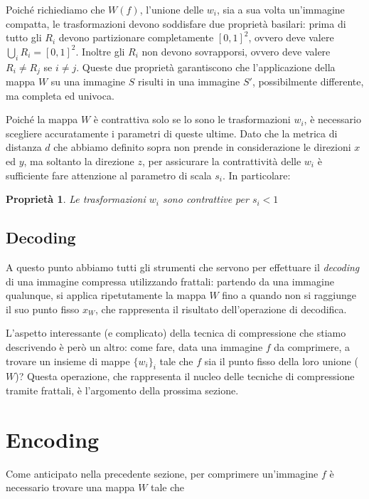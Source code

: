 \documentclass[11pt,a4paper,appendixprefix=true,numbers=noenddot]{scrreprt}
\newtheorem{proprieta}[teorema]{Proprietà}
\begin{document}
Poiché richiediamo che $W(f)$, l'unione delle $w_i$, sia a sua volta un'immagine compatta, le trasformazioni devono soddisfare due proprietà basilari: prima di tutto gli $R_i$ devono partizionare completamente $[0,1]^2$, ovvero deve valere $\bigcup_i R_i = [0,1]^2$. Inoltre gli $R_i$ non devono sovrapporsi, ovvero deve valere $R_i \not= R_j$ se $i \not= j$. Queste due proprietà garantiscono che l'applicazione della mappa $W$ su una immagine $S$ risulti in una immagine $S'$, possibilmente differente, ma completa ed univoca.

Poiché la mappa $W$ è contrattiva solo se lo sono le trasformazioni $w_i$, è necessario scegliere accuratamente i parametri di queste ultime. Dato che la metrica di distanza $d$ che abbiamo definito sopra non prende in considerazione le direzioni $x$ ed $y$, ma soltanto la direzione $z$, per assicurare la contrattività delle $w_i$ è sufficiente fare attenzione al parametro di scala $s_i$. In particolare:

\begin{proprieta}
Le trasformazioni $w_i$ sono contrattive per $s_i < 1$
\end{proprieta}

\subsection*{Decoding}

A questo punto abbiamo tutti gli strumenti che servono per effettuare il \emph{decoding} di una immagine compressa utilizzando frattali: partendo  da una immagine qualunque, si applica ripetutamente la mappa $W$ fino a quando non si raggiunge il suo punto fisso $x_W$, che rappresenta il risultato dell'operazione di decodifica.

L'aspetto interessante (e complicato) della tecnica di compressione che stiamo descrivendo è però un altro: come fare, data una immagine $f$ da comprimere, a trovare un insieme di mappe $\{w_i\}_i$ tale che $f$ sia il punto fisso della loro unione ($W$)? Questa operazione, che rappresenta il nucleo delle tecniche di compressione tramite frattali, è l'argomento della prossima sezione.

\section{Encoding}

Come anticipato nella precedente sezione, per comprimere un'immagine $f$ è necessario trovare una mappa $W$ tale che 
\end{document}
